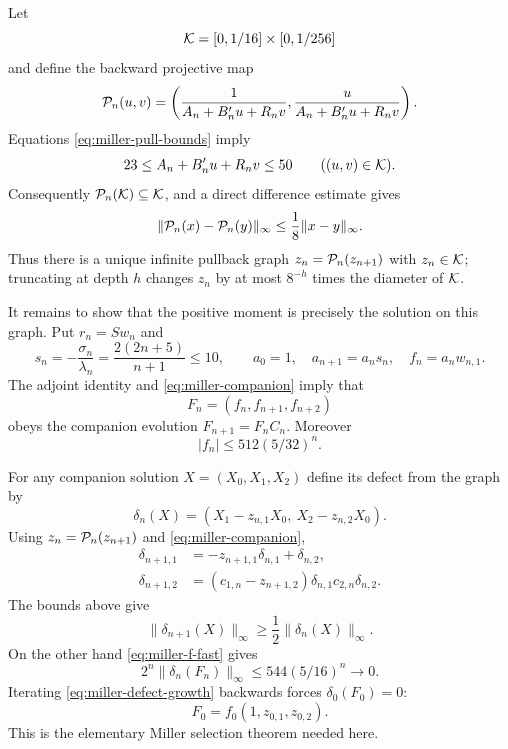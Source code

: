 Let
\[
 {\cal K}=[0,1/16]\times[0,1/256]
\]
and define the backward projective map
\begin{equation}\label{eq:miller-pull}
 {\cal P}_n(u,v)=
 \left(\frac1{A_n+B_n'u+R_nv},
       \frac{u}{A_n+B_n'u+R_nv}\right).
\end{equation}
Equations \eqref{eq:miller-pull-bounds} imply
\[
 23\leq A_n+B_n'u+R_nv\leq50
       \qquad((u,v)\in{\cal K}).
\]
Consequently ${\cal P}_n({\cal K})\subseteq{\cal K}$, and a direct
difference estimate gives
\begin{equation}\label{eq:miller-contraction}
 \|{\cal P}_n(x)-{\cal P}_n(y)\|_\infty
       \leq\frac18\|x-y\|_\infty .
\end{equation}
Thus there is a unique infinite pullback graph
$z_n={\cal P}_n(z_{n+1})$ with $z_n\in{\cal K}$; truncating at depth $h$
changes $z_n$ by at most $8^{-h}$ times the diameter of ${\cal K}$.

It remains to show that the positive moment is precisely the solution on
this graph.  Put $r_n=Sw_n$ and
\[
 s_n=-\frac{\sigma_n}{\lambda_n}
       =\frac{2(2n+5)}{n+1}\leq10,\qquad
 a_0=1,\quad a_{n+1}=a_ns_n,\quad f_n=a_nw_{n,1}.
\]
The adjoint identity and \eqref{eq:miller-companion} imply that
\[
             F_n=(f_n,f_{n+1},f_{n+2})
\]
obeys the companion evolution $F_{n+1}=F_nC_n$.  Moreover
\begin{equation}\label{eq:miller-f-fast}
             |f_n|\leq512(5/32)^n.
\end{equation}

For any companion solution $X=(X_0,X_1,X_2)$ define its defect from the
graph by
\[
 \delta_n(X)=(X_1-z_{n,1}X_0,\ X_2-z_{n,2}X_0).
\]
Using $z_n={\cal P}_n(z_{n+1})$ and \eqref{eq:miller-companion},
\begin{align*}
\delta_{n+1,1}&=-z_{n+1,1}\delta_{n,1}+\delta_{n,2},\\
\delta_{n+1,2}&=(c_{1,n}-z_{n+1,2})\delta_{n,1}
                         c_{2,n}\delta_{n,2}.
\end{align*}
The bounds above give
\begin{equation}\label{eq:miller-defect-growth}
             \|\delta_{n+1}(X)\|_\infty
                  \geq\frac12\|\delta_n(X)\|_\infty.
\end{equation}
On the other hand \eqref{eq:miller-f-fast} gives
\[
 2^n\|\delta_n(F_n)\|_\infty
       \leq544(5/16)^n\longrightarrow0.
\]
Iterating \eqref{eq:miller-defect-growth} backwards forces
$\delta_0(F_0)=0$:
\begin{equation}\label{eq:miller-selected}
              F_0=f_0(1,z_{0,1},z_{0,2}).
\end{equation}
This is the elementary Miller selection theorem needed here.

